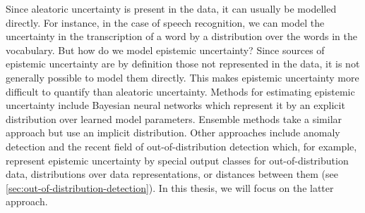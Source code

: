 Since aleatoric uncertainty is present in the data, it can usually be modelled directly. For instance, in the case of speech recognition, we can model the uncertainty in the transcription of a word by a distribution over the words in the vocabulary. But how do we model epistemic uncertainty? 
Since sources of epistemic uncertainty are by definition those not represented in the data, it is not generally possible to model them directly. This makes epistemic uncertainty more difficult to quantify than aleatoric uncertainty. 
Methods for estimating epistemic uncertainty include Bayesian neural networks \parencite{mackay_practical_1992, neal_bayesian_1995} which represent it by an explicit distribution over learned model parameters. Ensemble methods \parencite{gal_dropout_2016,lakshminarayanan_simple_2017} take a similar approach but use an implicit distribution. 
Other approaches include anomaly detection and the recent field of out-of-distribution detection which, for example, represent epistemic uncertainty by special output classes for out-of-distribution data, distributions over data representations, or distances between them (see \cref{sec:out-of-distribution-detection}). In this thesis, we will focus on the latter approach. 



